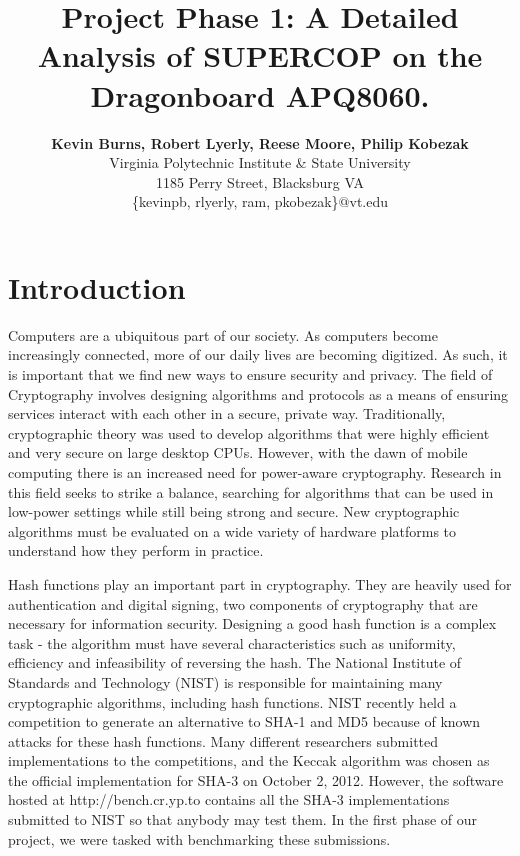 \documentclass[10pt,a4paper]{article}
\title{\LARGE
    Project Phase 1: A Detailed Analysis of SUPERCOP on the Dragonboard APQ8060.
}
\author{\large
{\bf Kevin Burns, Robert Lyerly, Reese Moore, Philip Kobezak}\\ 
Virginia Polytechnic Institute \& State University\\
1185 Perry Street, Blacksburg VA\\
\vspace{8mm}
\{kevinpb, rlyerly, ram, pkobezak\}$@$vt.edu\\
}
\date{}
\begin{document}
\maketitle


\section{Introduction}
Computers are a ubiquitous part of our society.  As computers become increasingly connected, more of our daily lives are becoming digitized.  As such, it is important that we find new ways to ensure security and privacy.  The field of Cryptography involves designing algorithms and protocols as a means of ensuring services interact with each other in a secure, private way.  Traditionally, cryptographic theory was used to develop algorithms that were highly efficient and very secure on large desktop CPUs.  However, with the dawn of mobile computing there is an increased need for power-aware cryptography.  Research in this field seeks to strike a balance, searching for algorithms that can be used in low-power settings while still being strong and secure.  New cryptographic algorithms must be evaluated on a wide variety of hardware platforms to understand how they perform in practice.

Hash functions play an important part in cryptography.  They are heavily used for authentication and digital signing, two components of cryptography that are necessary for information security.  Designing a good hash function is a complex task - the algorithm must have several characteristics such as uniformity, efficiency and infeasibility of reversing the hash.  The National Institute of Standards and Technology (NIST) is responsible for maintaining many cryptographic algorithms, including hash functions.  NIST recently held a competition to generate an alternative to SHA-1 and MD5 because of known attacks for these hash functions.  Many different researchers submitted implementations to the competitions, and the Keccak algorithm was chosen as the official implementation for SHA-3 on October 2, 2012.  However, the software hosted at http://bench.cr.yp.to contains all the SHA-3 implementations submitted to NIST so that anybody may test them.  In the first phase of our project, we were tasked with benchmarking these submissions.
\end{document}
